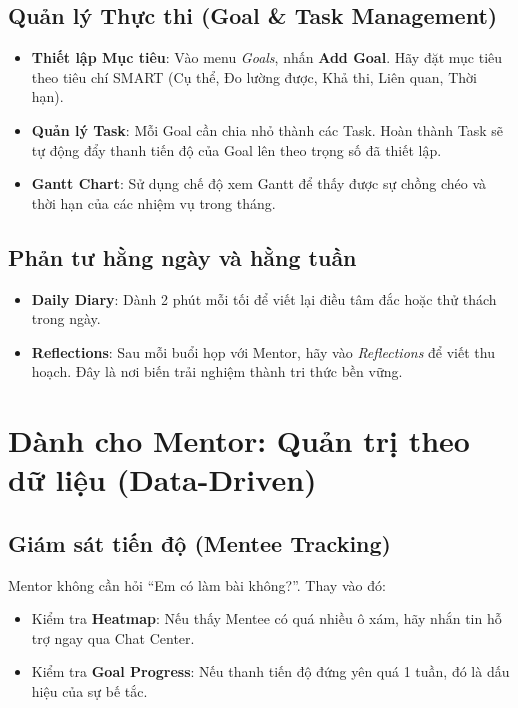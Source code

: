 \subsection{Quản lý Thực thi (Goal \& Task Management)}
\begin{itemize}
    \item \textbf{Thiết lập Mục tiêu}: Vào menu \textit{Goals}, nhấn \textbf{Add Goal}. Hãy đặt mục tiêu theo tiêu chí SMART (Cụ thể, Đo lường được, Khả thi, Liên quan, Thời hạn).
    \item \textbf{Quản lý Task}: Mỗi Goal cần chia nhỏ thành các Task. Hoàn thành Task sẽ tự động đẩy thanh tiến độ của Goal lên theo trọng số đã thiết lập.
    \item \textbf{Gantt Chart}: Sử dụng chế độ xem Gantt để thấy được sự chồng chéo và thời hạn của các nhiệm vụ trong tháng.
\end{itemize}

\subsection{Phản tư hằng ngày và hằng tuần}
\begin{itemize}
    \item \textbf{Daily Diary}: Dành 2 phút mỗi tối để viết lại điều tâm đắc hoặc thử thách trong ngày.
    \item \textbf{Reflections}: Sau mỗi buổi họp với Mentor, hãy vào \textit{Reflections} để viết thu hoạch. Đây là nơi biến trải nghiệm thành tri thức bền vững.
\end{itemize}

\section{Dành cho Mentor: Quản trị theo dữ liệu (Data-Driven)}

\subsection{Giám sát tiến độ (Mentee Tracking)}
Mentor không cần hỏi ``Em có làm bài không?''. Thay vào đó:
\begin{itemize}
    \item Kiểm tra \textbf{Heatmap}: Nếu thấy Mentee có quá nhiều ô xám, hãy nhắn tin hỗ trợ ngay qua Chat Center.
    \item Kiểm tra \textbf{Goal Progress}: Nếu thanh tiến độ đứng yên quá 1 tuần, đó là dấu hiệu của sự bế tắc.
\end{itemize}

